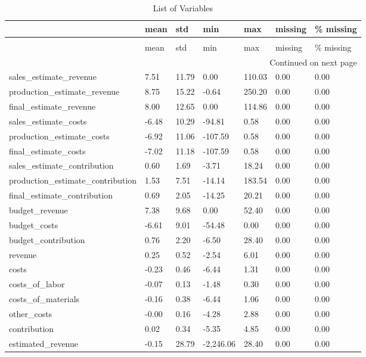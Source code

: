 \begin{landscape}\begin{longtable}[h!]{lllllll}
\caption{List of Variables} \label{eda_1} \\
\toprule
 & mean & std & min & max & missing & \% missing \\
\midrule
\endfirsthead
\caption[]{List of Variables} \\
\toprule
 & mean & std & min & max & missing & \% missing \\
\midrule
\endhead
\midrule
\multicolumn{7}{r}{Continued on next page} \\
\midrule
\endfoot
\bottomrule
\endlastfoot
sales_estimate_revenue & 7.51 & 11.79 & 0.00 & 110.03 & 0.00 & 0.00 \\
production_estimate_revenue & 8.75 & 15.22 & -0.64 & 250.20 & 0.00 & 0.00 \\
final_estimate_revenue & 8.00 & 12.65 & 0.00 & 114.86 & 0.00 & 0.00 \\
sales_estimate_costs & -6.48 & 10.29 & -94.81 & 0.58 & 0.00 & 0.00 \\
production_estimate_costs & -6.92 & 11.06 & -107.59 & 0.58 & 0.00 & 0.00 \\
final_estimate_costs & -7.02 & 11.18 & -107.59 & 0.58 & 0.00 & 0.00 \\
sales_estimate_contribution & 0.60 & 1.69 & -3.71 & 18.24 & 0.00 & 0.00 \\
production_estimate_contribution & 1.53 & 7.51 & -14.14 & 183.54 & 0.00 & 0.00 \\
final_estimate_contribution & 0.69 & 2.05 & -14.25 & 20.21 & 0.00 & 0.00 \\
budget_revenue & 7.38 & 9.68 & 0.00 & 52.40 & 0.00 & 0.00 \\
budget_costs & -6.61 & 9.01 & -54.48 & 0.00 & 0.00 & 0.00 \\
budget_contribution & 0.76 & 2.20 & -6.50 & 28.40 & 0.00 & 0.00 \\
revenue & 0.25 & 0.52 & -2.54 & 6.01 & 0.00 & 0.00 \\
costs & -0.23 & 0.46 & -6.44 & 1.31 & 0.00 & 0.00 \\
costs_of_labor & -0.07 & 0.13 & -1.48 & 0.30 & 0.00 & 0.00 \\
costs_of_materials & -0.16 & 0.38 & -6.44 & 1.06 & 0.00 & 0.00 \\
other_costs & -0.00 & 0.16 & -4.28 & 2.88 & 0.00 & 0.00 \\
contribution & 0.02 & 0.34 & -5.35 & 4.85 & 0.00 & 0.00 \\
estimated_revenue & -0.15 & 28.79 & -2,246.06 & 28.40 & 0.00 & 0.00 \\

\end{longtable}
\end{landscape}
